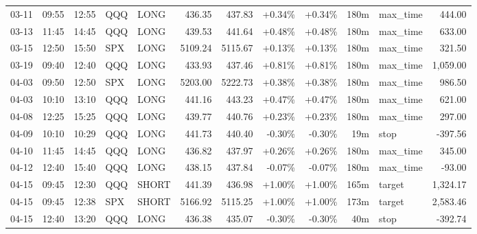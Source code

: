 \documentclass[11pt,a4paper,twoside]{article}
\begin{document}
\begin{center}
\begin{longtable}{>{\color{txtmain}}l l l l l r r r r r >{\color{txtmain}}l r}
03-11 & 09:55 & 12:55 & QQQ & LONG & 436.35 & 437.83 & \textcolor{wingreen}{+0.34\%} & \textcolor{wingreen}{+0.34\%} & 180m & max\_time & \textcolor{wingreen}{444.00} \\
03-13 & 11:45 & 14:45 & QQQ & LONG & 439.53 & 441.64 & \textcolor{wingreen}{+0.48\%} & \textcolor{wingreen}{+0.48\%} & 180m & max\_time & \textcolor{wingreen}{633.00} \\
03-15 & 12:50 & 15:50 & SPX & LONG & 5109.24 & 5115.67 & \textcolor{wingreen}{+0.13\%} & \textcolor{wingreen}{+0.13\%} & 180m & max\_time & \textcolor{wingreen}{321.50} \\
03-19 & 09:40 & 12:40 & QQQ & LONG & 433.93 & 437.46 & \textcolor{wingreen}{+0.81\%} & \textcolor{wingreen}{+0.81\%} & 180m & max\_time & \textcolor{wingreen}{1,059.00} \\
04-03 & 09:50 & 12:50 & SPX & LONG & 5203.00 & 5222.73 & \textcolor{wingreen}{+0.38\%} & \textcolor{wingreen}{+0.38\%} & 180m & max\_time & \textcolor{wingreen}{986.50} \\
04-03 & 10:10 & 13:10 & QQQ & LONG & 441.16 & 443.23 & \textcolor{wingreen}{+0.47\%} & \textcolor{wingreen}{+0.47\%} & 180m & max\_time & \textcolor{wingreen}{621.00} \\
04-08 & 12:25 & 15:25 & QQQ & LONG & 439.77 & 440.76 & \textcolor{wingreen}{+0.23\%} & \textcolor{wingreen}{+0.23\%} & 180m & max\_time & \textcolor{wingreen}{297.00} \\
04-09 & 10:10 & 10:29 & QQQ & LONG & 441.73 & 440.40 & \textcolor{lossred}{-0.30\%} & \textcolor{lossred}{-0.30\%} & 19m & stop & \textcolor{lossred}{-397.56} \\
04-10 & 11:45 & 14:45 & QQQ & LONG & 436.82 & 437.97 & \textcolor{wingreen}{+0.26\%} & \textcolor{wingreen}{+0.26\%} & 180m & max\_time & \textcolor{wingreen}{345.00} \\
04-12 & 12:40 & 15:40 & QQQ & LONG & 438.15 & 437.84 & \textcolor{lossred}{-0.07\%} & \textcolor{lossred}{-0.07\%} & 180m & max\_time & \textcolor{lossred}{-93.00} \\
04-15 & 09:45 & 12:30 & QQQ & SHORT & 441.39 & 436.98 & \textcolor{wingreen}{+1.00\%} & \textcolor{wingreen}{+1.00\%} & 165m & target & \textcolor{wingreen}{1,324.17} \\
04-15 & 09:45 & 12:38 & SPX & SHORT & 5166.92 & 5115.25 & \textcolor{wingreen}{+1.00\%} & \textcolor{wingreen}{+1.00\%} & 173m & target & \textcolor{wingreen}{2,583.46} \\
04-15 & 12:40 & 13:20 & QQQ & LONG & 436.38 & 435.07 & \textcolor{lossred}{-0.30\%} & \textcolor{lossred}{-0.30\%} & 40m & stop & \textcolor{lossred}{-392.74} \\

\end{longtable}
\end{center}
\end{document}
